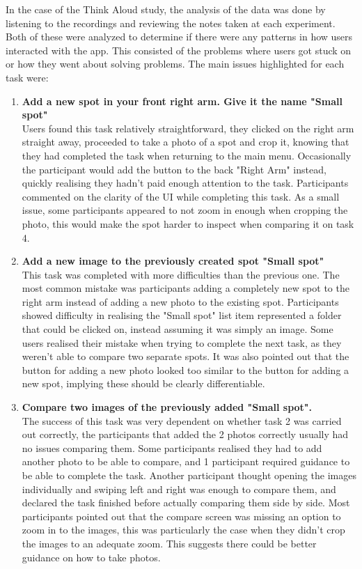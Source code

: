 In the case of the Think Aloud study, the analysis of the data was done by listening to the recordings and reviewing the notes taken at each experiment. Both of these were analyzed to determine if there were any patterns in how users interacted with the app. This consisted of the problems where users got stuck on or how they went about solving problems. The main issues highlighted for each task were:
\begin{enumerate}
    \item \textbf{Add a new spot in your front right arm. Give it the name "Small spot"}
    \\ Users found this task relatively straightforward, they clicked on the right arm straight away, proceeded to take a photo of a spot and crop it, knowing that they had completed the task when returning to the main menu. Occasionally the participant would add the button to the back "Right Arm" instead, quickly realising they hadn't paid enough attention to the task. Participants commented on the clarity of the UI while completing this task. As a small issue, some participants appeared to not zoom in enough when cropping the photo, this would make the spot harder to inspect when comparing it on task 4.
    \item \textbf{Add a new image to the previously created spot "Small spot"}
    \\ This task was completed with more difficulties than the previous one. The most common mistake was participants adding a completely new spot to the right arm instead of adding a new photo to the existing spot. Participants showed difficulty in realising the "Small spot" list item represented a folder that could be clicked on, instead assuming it was simply an image. Some users realised their mistake when trying to complete the next task, as they weren't able to compare two separate spots. It was also pointed out that the button for adding a new photo looked too similar to the button for adding a new spot, implying these should be clearly differentiable.
    \item \textbf{Compare two images of the previously added "Small spot".}
    \\ The success of this task was very dependent on whether task 2 was carried out correctly, the participants that added the 2 photos correctly usually had no issues comparing them. Some participants realised they had to add another photo to be able to compare, and 1 participant required guidance to be able to complete the task. Another participant thought opening the images individually and swiping left and right was enough to compare them, and declared the task finished before actually comparing them side by side. Most participants pointed out that the compare screen was missing an option to zoom in to the images, this was particularly the case when they didn't crop the images to an adequate zoom. This suggests there could be better guidance on how to take photos. 

\end{enumerate}
